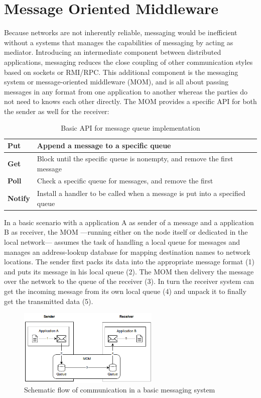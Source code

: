 \section{Message Oriented Middleware}
\label{intro-messaging-mom}
Because networks are not inherently reliable, messaging would be inefficient
without a systems that manages the capabilities of messaging by acting as
mediator. Introducing an intermediate component between distributed
applications, messaging reduces the close coupling of other communication styles
based on sockets or RMI/RPC. This additional component is the messaging
system or message-oriented middleware (MOM), and is all about passing messages
in any format from one application to another whereas the parties do not need to
knows each other directly. \cite{TAN06} The MOM provides a specific API for both
the sender as well for the receiver:
\begin{table}[H]
\centering
\begin{tabular}{|l|l|}
\hline
\textbf{Put}    & Append a message to a specific queue                                        \\ \hline
\textbf{Get}    & Block until the specific queue is nonempty, and remove the first message    \\ \hline
\textbf{Poll}   & Check a specific queue for messages, and remove the first                   \\ \hline
\textbf{Notify} & Install a handler to be called when a message is put into a specified queue \\ \hline
\end{tabular}
\caption{Basic API for message queue implementation \cite{TAN06}}
\end{table}

In a basic scenario with a application A as sender of a message and a
application B as receiver, the MOM ---running either on the node itself or
dedicated in the local network--- assumes the task of handling a local queue for
messages and manages an address-lookup database for mapping destination names to
network locations. The sender first packs its data into the appropriate
message format (1) and puts its message in his local queue (2). The MOM then
delivery the message over the network to the queue of the receiver (3). In turn the
receiver system can get the incoming message from its own local queue (4) and
unpack it to finally get the transmitted data (5). 
\begin{figure}[H]
    \centering
    \includegraphics[width=0.6\textwidth]{images/mom-schema.png}
    \caption{Schematic flow of communication in a basic messaging system }
    \label{fig:message-oriented-middleware}
\end{figure}


